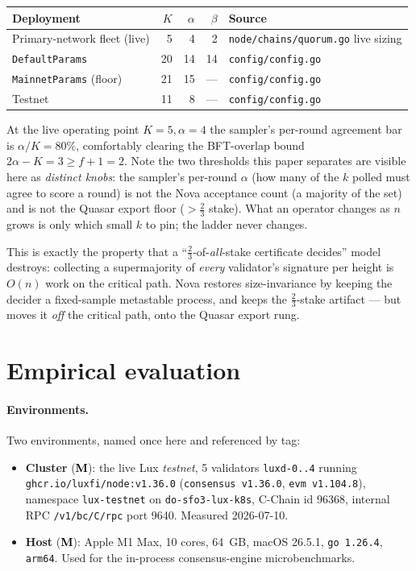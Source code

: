 \documentclass[11pt,a4paper]{article}
\newcommand{\Mnow}{\textbf{\textcolor{black}{M}}}   %
\begin{document}
\begin{center}
\begin{tabular}{@{}l r r r l@{}}
\toprule
\textbf{Deployment} & \(K\) & \(\alpha\) & \(\beta\) & \textbf{Source} \\
\midrule
Primary-network fleet (live)   & 5  & 4  & 2  & \texttt{node/chains/quorum.go} live sizing \\
\texttt{DefaultParams}         & 20 & 14 & 14 & \texttt{config/config.go} \\
\texttt{MainnetParams} (floor) & 21 & 15 & --- & \texttt{config/config.go} \\
Testnet                        & 11 & 8  & --- & \texttt{config/config.go} \\
\bottomrule
\end{tabular}
\end{center}

At the live operating point \(K{=}5, \alpha{=}4\) the sampler's per-round agreement bar is
\(\alpha/K = 80\%\), comfortably clearing the BFT-overlap bound \(2\alpha-K = 3 \ge f+1 = 2\).
Note the two thresholds this paper separates are visible here as \emph{distinct knobs}: the
sampler's per-round \(\alpha\) (how many of the \(k\) polled must agree to score a round) is
not the Nova acceptance count (a majority of the set) and is not the Quasar export floor
(\(>\tfrac{2}{3}\) stake). What an operator changes as \(n\) grows is only which small \(k\)
to pin; the ladder never changes.

This is exactly the property that a ``\(\tfrac{2}{3}\)-of-\emph{all}-stake certificate
decides'' model destroys: collecting a supermajority of \emph{every} validator's signature per
height is \(O(n)\) work on the critical path. Nova restores size-invariance by keeping the
decider a fixed-sample metastable process, and keeps the \(\tfrac{2}{3}\)-stake artifact ---
but moves it \emph{off} the critical path, onto the Quasar export rung.

\section{Empirical evaluation}
\label{sec:eval}

\paragraph{Environments.} Two environments, named once here and referenced by tag:
\begin{itemize}[leftmargin=1.4em]
\item \textbf{Cluster} (\Mnow): the live Lux \emph{testnet}, \num{5} validators
\texttt{luxd-0..4} running \texttt{ghcr.io/luxfi/node:v1.36.0} (\texttt{consensus v1.36.0},
\texttt{evm v1.104.8}), namespace \texttt{lux-testnet} on \texttt{do-sfo3-lux-k8s}, C-Chain
id \num{96368}, internal RPC \texttt{/v1/bc/C/rpc} port \num{9640}. Measured 2026-07-10.
\item \textbf{Host} (\Mnow): Apple M1 Max, 10 cores, \SI{64}{GB}, macOS 26.5.1, \texttt{go
1.26.4}, \texttt{arm64}. Used for the in-process consensus-engine microbenchmarks.
\end{itemize}
\end{document}
